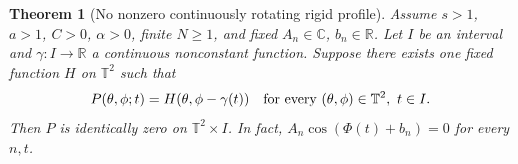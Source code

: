 \documentclass[11pt,a4paper]{article}
\newtheorem{theorem}{Theorem}[section]
\theoremstyle{definition}
\theoremstyle{remark}
\newcommand{\R}{\mathbb R}
\newcommand{\C}{\mathbb C}
\newcommand{\T}{\mathbb T}
\begin{document}
\par\noindent\begin{minipage}{\linewidth}
\begin{theorem}[No nonzero continuously rotating rigid profile]
\label{thm:rotation}
Assume $s>1$, $a>1$, $C>0$, $\alpha>0$, finite $N\geq1$, and
fixed $A_n\in\C$, $b_n\in\R$. Let $I$ be an interval and
$\gamma:I\to\R$ a continuous nonconstant function. Suppose
there exists one fixed function $H$ on $\T^2$ such that
\begin{equation}
 P(\theta,\phi;t)=H(\theta,\phi-\gamma(t))
 \quad\hbox{for every }(\theta,\phi)\in\T^2,\ t\in I.
 \label{eq:rotation}
\end{equation}
Then $P$ is identically zero on $\T^2\times I$. In fact,
$A_n\cos(\Phi(t)+b_n)=0$ for every $n,t$.
\end{theorem}
\end{minipage}\par
\end{document}
